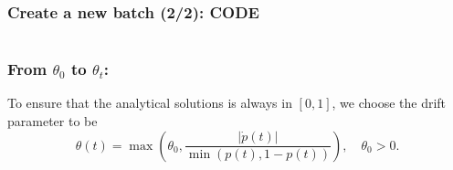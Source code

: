 \documentclass[aspectratio=169]{beamer}\usepackage[utf8]{inputenc}
\begin{document}
\begin{frame}\frametitle{Create a new batch (2/2): CODE}

\begin{center}
\begin{tabular}{|c|}
\toprule
{\tiny

}\\
\bottomrule
\end{tabular}
\end{center}

\end{frame}


\begin{frame}\frametitle{From $\theta_0$ to $\theta_t$:}

To ensure that the analytical solutions is always in $[0,1]$, we choose the drift parameter to be
\begin{equation*}
\theta(t) = \max\left(\theta_0,\frac{|\dot{p}(t)|}{\min(p(t),1-p(t))}\right),\quad\theta_0>0.
\end{equation*}
\quad\\
\quad\\
\begin{center}
\begin{tabular}{|c|}
\toprule
{\tiny

}\\
\bottomrule
\end{tabular}
\end{center}

\end{frame}
\end{document}

